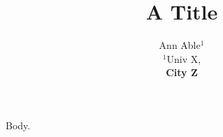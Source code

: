 \documentclass{article}
\begin{document}
\title{A Title}
\author{\begin{tabular}{c}Ann Able$^1$\\ $^1$Univ X,\\ \bf City Z\end{tabular}}
\maketitle
Body.
\end{document}
